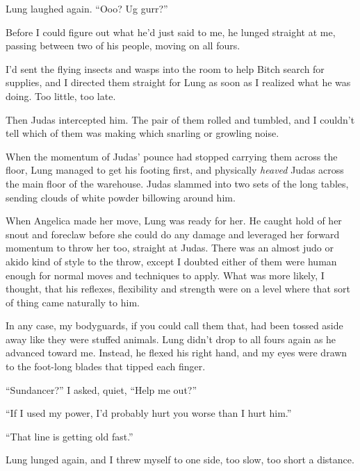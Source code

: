 Lung laughed again.  ``Ooo?  Ug gurr?''



Before I could figure out what he'd just said to me, he lunged straight at me, passing between two of his people, moving on all fours.



I'd sent the flying insects and wasps into the room to help Bitch search for supplies, and I directed them straight for Lung as soon as I realized what he was doing.  Too little, too late.



Then Judas intercepted him.  The pair of them rolled and tumbled, and I couldn't tell which of them was making which snarling or growling noise.



When the momentum of Judas' pounce had stopped carrying them across the floor, Lung managed to get his footing first, and physically \emph{heaved} Judas across the main floor of the warehouse.  Judas slammed into two sets of the long tables, sending clouds of white powder billowing around him.



When Angelica made her move, Lung was ready for her.  He caught hold of her snout and foreclaw before she could do any damage and leveraged her forward momentum to throw her too, straight at Judas.  There was an almost judo or akido kind of style to the throw, except I doubted either of them were human enough for normal moves and techniques to apply.  What was more likely, I thought, that his reflexes, flexibility and strength were on a level where that sort of thing came naturally to him.



In any case, my bodyguards, if you could call them that, had been tossed aside away like they were stuffed animals.  Lung didn't drop to all fours again as he advanced toward me.  Instead, he flexed his right hand, and my eyes were drawn to the foot-long blades that tipped each finger.



``Sundancer?'' I asked, quiet, ``Help me out?''



``If I used my power, I'd probably hurt you worse than I hurt him.''



``That line is getting old fast.''



Lung lunged again, and I threw myself to one side, too slow, too short a distance.



